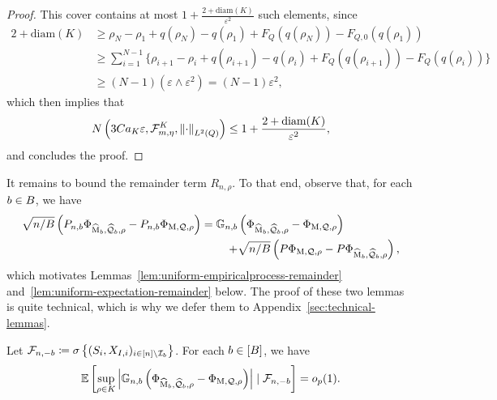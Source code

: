 \begin{proof}
This cover contains at most $1+ \frac{2+ \textrm{diam}(K)}{ \varepsilon^2}$ such elements,  
since
\begin{align*}
2+ \textrm{diam}(K) &\ge \rho_N - \rho_1 + q(\rho_{N}) - q(\rho_1) + F_{Q}(q(\rho_{N})) - F_{Q,0}(q(\rho_1))  \\
&\ge 
\sum_{i=1}^{N-1} \big\{
\rho_{i+1} - \rho_i + q(\rho_{i+1}) - q(\rho_i) + F_{Q}(q(\rho_{i+1})) - F_{Q}(q(\rho_i)) \big\} \\
&\ge (N-1)(\varepsilon \wedge \varepsilon^2) = (N-1)\varepsilon^2,
\end{align*}
 which then implies that
\begin{align*}
N \left(3Ca_K \varepsilon,  \mathcal{F}_{m,\eta}^K, \left\|{\cdot}\right\|_{L^2(Q)} \right) \le 1+\frac{2+ \textrm{diam}(K)}{ \varepsilon^2},
\end{align*}
and concludes the proof.
\end{proof}

It remains to bound the remainder term $R_{n,\rho}$.  To that end,  observe that, for each $b \in B$, we have
\begin{align*}
\begin{split}
\sqrt{n/B} \left( P_{n,b} \Phi_{\widehat{\operatorname*{M}}_b, \widehat{\mathcal{Q}}_b, \rho} - P_{n,b} \Phi_{\operatorname*{M},  \mathcal{Q}, \rho} \right) 
= \mathbb{G}_{n,b}& \left( \Phi_{\widehat{\operatorname*{M}}_b, \widehat{\mathcal{Q}}_b, \rho} - \Phi_{\operatorname*{M},  \mathcal{Q}, \rho} \right) \\ +& \sqrt{n/B}\left(P\Phi_{\operatorname*{M},  \mathcal{Q}, \rho} - P \Phi_{\widehat{\operatorname*{M}}_b, \widehat{\mathcal{Q}}_b, \rho} \right),
\end{split} 
\end{align*}
which motivates Lemmas~\ref{lem:uniform-empiricalprocess-remainder} and~\ref{lem:uniform-expectation-remainder} below. 
The proof of these two lemmas is quite technical, which is why we defer them to Appendix~\ref{sec:technical-lemmas}. 
\begin{lemma}
\label{lem:uniform-empiricalprocess-remainder}
Let $\mathcal{F}_{n,-b} \coloneqq \sigma \left\{ (S_i , X_{I,i})_{i \in [n] \setminus \mathcal{I}_b} \right\} $. 
For each $b \in [B]$, we have
\begin{align*}
\mathbb{E}\left[ \sup_{\rho \in K} \left|  \mathbb{G}_{n,b}\left( \Phi_{\widehat{\operatorname*{M}}_b, \widehat{\mathcal{Q}}_b, \rho} - \Phi_{\operatorname*{M},  \mathcal{Q}, \rho} \right) \right| \mid \mathcal{F}_{n,-b} \right] = o_p(1).
\end{align*}
\end{lemma}

